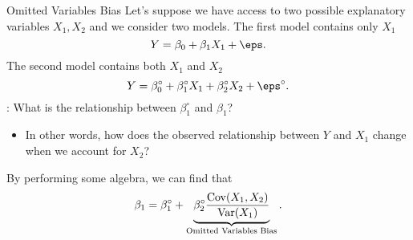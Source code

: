 \documentclass[notheorems, 9pt]{beamer}
\begin{document}
\begin{frame}{Omitted Variables Bias} %
	\label{frame:omitted2} %
	Let's suppose we have access to two possible explanatory variables \(X_1,X_2\) and we consider two models. The first model contains only  \(X_1\)
	\[
	    Y = \beta_0 + \beta_1 X_1 + \eps 
	.\]
	The second model contains both \(X_1\) and  \(X_2\)
	 \[
	    Y = \beta_0^\circ + \beta_1^\circ X_1 + \beta_2^\circ X_2 + \eps^\circ
	.\] 
	\onslide<2->
	: What is the relationship between \(\beta_1^\circ\) and  \(\beta_1\)? 
	 \begin{itemize}
		 \item In other words, how does the observed relationship between \(Y\) and  \(X_1\) change when we account for \(X_2\)?
	\end{itemize}
	By performing some algebra, we can find that
	\[
		\beta_1 = \beta_1^\circ + \underbrace{\beta_2^\circ\frac{\operatorname{Cov}(X_1,X_2)}{\operatorname{Var}(X_1)}}_{\text{Omitted Variables Bias}}
	.\] 
\end{frame}
\end{document}
